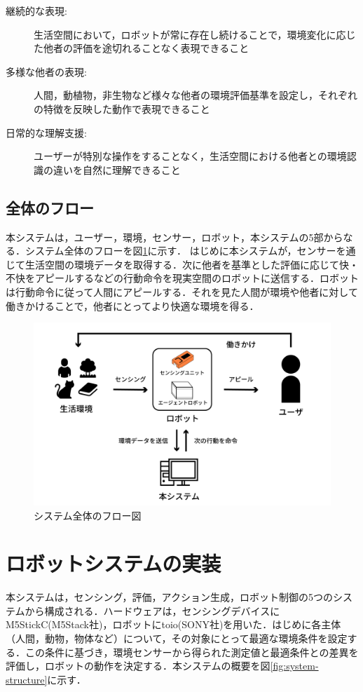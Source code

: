 \documentclass[paper=a4paper,jafontsize=9pt,head_space=15mm,gutter=20mm,
twocolumn,number_of_lines=49, line_length=26zw]{myuarticle}
\begin{document}
\begin{description}
  \item[継続的な表現:] 生活空間において，ロボットが常に存在し続けることで，環境変化に応じた他者の評価を途切れることなく表現できること
  \item[多様な他者の表現:] 人間，動植物，非生物など様々な他者の環境評価基準を設定し，それぞれの特徴を反映した動作で表現できること
  \item[日常的な理解支援:] ユーザーが特別な操作をすることなく，生活空間における他者との環境認識の違いを自然に理解できること
\end{description}

\subsection{全体のフロー}
本システムは，ユーザー，環境，センサー，ロボット，本システムの5部からなる．システム全体のフローを図\ref{fig:system-flow}に示す．
はじめに本システムが，センサーを通じて生活空間の環境データを取得する．次に他者を基準とした評価に応じて快・不快をアピールするなどの行動命令を現実空間のロボットに送信する．ロボットは行動命令に従って人間にアピールする．それを見た人間が環境や他者に対して働きかけることで，他者にとってより快適な環境を得る．

\begin{figure}[h]
  \centering
  \includegraphics[keepaspectratio,width=0.8\columnwidth]{resources/system_flow.png}
  \caption{システム全体のフロー図}
  \label{fig:system-flow}
\end{figure}

\section{ロボットシステムの実装}
本システムは，センシング，評価，アクション生成，ロボット制御の5つのシステムから構成される．ハードウェアは，センシングデバイスにM5StickC(M5Stack社)，ロボットにtoio(SONY社)を用いた．はじめに各主体（人間，動物，物体など）について，その対象にとって最適な環境条件を設定する．この条件に基づき，環境センサーから得られた測定値と最適条件との差異を評価し，ロボットの動作を決定する．本システムの概要を図\ref{fig:system-structure}に示す．
\end{document}
